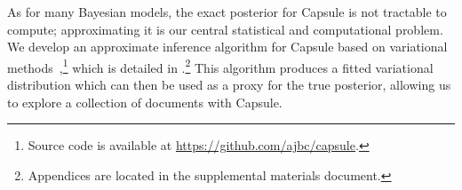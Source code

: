 As for many Bayesian models, the exact posterior for Capsule is not tractable to compute; approximating it is our central statistical and computational problem.  We develop an approximate inference algorithm for Capsule based on variational methods~\cite{Jordan:1999},\footnote{Source code is available at \url{https://github.com/ajbc/capsule}.} which is detailed in .\footnote{Appendices are located in the supplemental materials document.} This algorithm produces a fitted variational distribution which can then be used as a proxy for the true posterior, allowing us to explore a collection of documents with Capsule.
